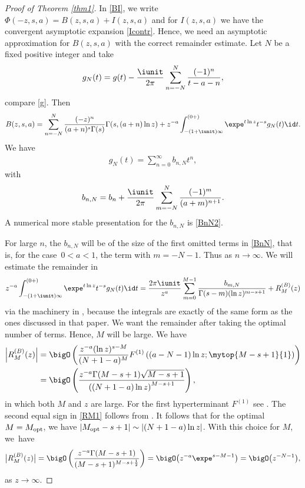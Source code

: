 \begin{proof}[Proof of Theorem \ref{thm1}]
In \eqref{BI}, we write $\Phi(-z,s,a)=B(z,s,a)+I(z,s,a)$ and for $I(z,s,a)$
we have the convergent asymptotic expansion \eqref{Icontr}. Hence, we need an asymptotic
approximation for $B(z,s,a)$ with the correct remainder estimate.
Let $N$ be a fixed positive integer and take
\begin{gather*}%
 g_N(t)=g(t)-\frac{\iunit}{2\pi}\sum_{n=-N}^N\frac{(-1)^n}{t-a-n},
\end{gather*}
compare \eqref{g}. Then
\begin{gather*}%
 B(z,s,a)=\sum_{n=-N}^N \frac{(-z)^n}{(a+n)^s\Gamma(s)}\Gamma(s,(a+n)\ln z)
 +z^{-a}\int_{-(1+\iunit)\infty}^{(0+)}\expe^{t\ln z} t^{-s}g_N(t)\id t.
\end{gather*}
We have
\begin{gather*}%
 g_N(t)=\sum_{n=0}^\infty b_{n,N}t^n,
\end{gather*}
with
\begin{gather}\label{BnN}
 b_{n,N}=b_n+\frac{\iunit}{2\pi}\sum_{m=-N}^N \frac{(-1)^m}{(a+m)^{n+1}}.
\end{gather}
A numerical more stable presentation for the $b_{n,N}$ is \eqref{BnN2}.

For large $n$, the $b_{n,N}$ will be of the size of the first omitted terms in \eqref{BnN},
that is, for the case~$0<a<1$, the term with $m=-N-1$.
Thus
 as $n\to\infty$.
We will estimate the remainder in
\begin{gather*}%
 z^{-a}\int_{-(1+\iunit)\infty}^{(0+)}\expe^{t\ln z} t^{-s}g_N(t)\id t
 =\frac{2\pi\iunit}{z^{a}}\sum_{m=0}^{M-1}
 \frac{b_{m,N}}{\Gamma(s-m)(\ln z)^{m-s+1}}+R_M^{(B)}(z)
\end{gather*}
via the machinery in \cite[Section~4]{OD98}, because the integrals are exactly of the same form
as the ones discussed in that paper.
We want the remainder after taking the optimal number of terms. Hence, $M$ will be large.
We have
\begin{align}
 \left|R_M^{(B)}(z)\right|&=\bigO\left(\frac{z^{-a} (\ln z)^{s-M}}{%
 (N+1-a)^{M}}F^{(1)}\left((a-N-1)\ln z;\mytop{M-s+1}{1}\right)\right)\nonumber\\
 &=\bigO\left(\frac{z^{-a} \Gamma(M-s+1)\sqrt{M-s+1}}{%
 \left((N+1-a)\ln z\right)^{M-s+1}}\right),\label{RM1}
\end{align}
in which both $M$ and $z$ are large. For the first hyperterminant $F^{(1)}$ see
\cite[Appendix A]{BHNOD2018}. The second equal sign in \eqref{RM1} follows from
\cite[Proposition~B.1]{BHNOD2018}.
It follows that for the optimal~${M=M_{\rm opt}}$, we have
$|M_{\rm opt}-s+1|\sim |(N+1-a)\ln z|$. With this choice for $M$, we~have
\begin{gather*}%
 \bigl|R_M^{(B)}(z)\bigr|=\bigO\left(\frac{z^{-a}
 \Gamma(M-s+1)}{(M-s+1)^{M-s+\frac12}}\right)=
 \bigO\bigl(z^{-a}\expe^{s-M-1}\bigr)=\bigO\bigl(z^{-N-1}\bigr),
\end{gather*}
as $z\to\infty$.


\end{proof}
